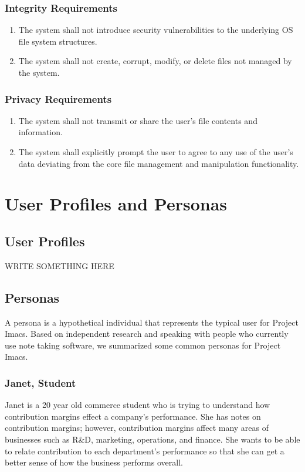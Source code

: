 \documentclass{article}
\begin{document}
\subsubsection{Integrity Requirements}
\begin{enumerate}[{I}NT1]
    \item The system shall not introduce security vulnerabilities to the underlying OS file system structures.
    \item The system shall not create, corrupt, modify, or delete files not managed by the system.
\end{enumerate}

\subsubsection{Privacy Requirements}
\begin{enumerate}[PR{I}1]
    \item The system shall not transmit or share the user's file contents and information.
    \item The system shall explicitly prompt the user to agree to any use of the user's data deviating from the core file management and manipulation functionality.
\end{enumerate}

\section{User Profiles and Personas}
\subsection{User Profiles}
WRITE SOMETHING HERE

\subsection{Personas}
A persona is a hypothetical individual that represents the typical user for Project Imacs. Based on independent research and speaking with people who currently use note taking software, we summarized some common personas for Project Imacs.

\subsubsection{Janet, Student}
Janet is a 20 year old commerce student who is trying to understand how contribution margins effect a company's performance. She has notes on contribution margins; however, contribution margins affect many areas of businesses such as R\&D, marketing, operations, and finance. She wants to be able to relate contribution to each department's performance so that she can get a better sense of how the business performs overall.
\end{document}
